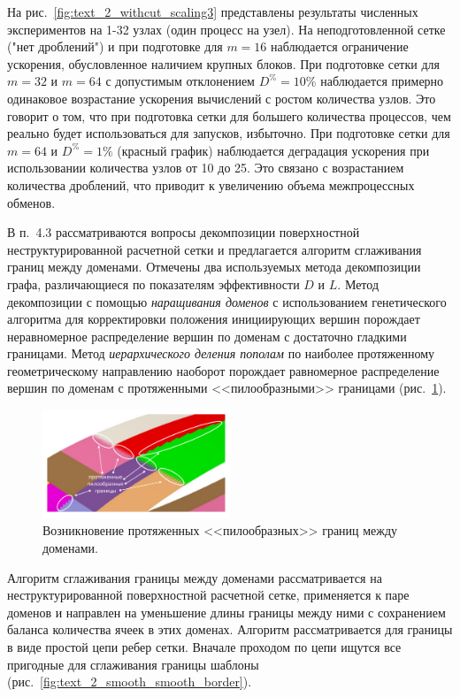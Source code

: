 \documentclass[a4paper,14pt]{extarticle}                     %
\theoremstyle{plain}                                         %
\begin{document}
На рис.~\ref{fig:text_2_withcut_scaling3} представлены результаты численных экспериментов на 1-32 узлах (один процесс на узел).
На неподготовленной сетке ("нет дроблений") и при подготовке для $m = 16$ наблюдается ограничение ускорения, обусловленное наличием крупных блоков. 
При подготовке сетки для $m = 32$ и $m = 64$ с допустимым отклонением $D^{\%} = 10\%$ наблюдается примерно одинаковое возрастание ускорения вычислений с ростом количества узлов.
Это говорит о том, что при подготовка сетки для большего количества процессов, чем реально будет использоваться для запусков, избыточно.
При подготовке сетки для $m = 64$ и $D^{\%} = 1\%$ (красный график) наблюдается деградация ускорения при использовании количества узлов от 10 до 25.
Это связано с возрастанием количества дроблений, что приводит к увеличению объема межпроцессных обменов.


В п.~4.3 рассматриваются вопросы декомпозиции поверхностной неструктурированной расчетной сетки и предлагается алгоритм сглаживания границ между доменами.
Отмечены два используемых метода декомпозиции графа, различающиеся по показателям эффективности $D$ и $L$.
Метод декомпозиции с помощью \textit{наращивания доменов} с использованием генетического алгоритма для корректировки положения инициирующих вершин порождает неравномерное распределение вершин по доменам с достаточно гладкими границами.
Метод \textit{иерархического деления пополам} по наиболее протяженному геометрическому направлению наоборот порождает равномерное распределение вершин по доменам с протяженными <<пилообразными>> границами (рис.~\ref{fig:text_2_smooth_bad_border}).

\begin{figure}[ht]
\centering
\includegraphics[width=0.5\textwidth]{./pics/text_2_smooth/bad-border.pdf}
\singlespacing
\caption{Возникновение протяженных <<пилообразных>> границ между доменами.}
\label{fig:text_2_smooth_bad_border}
\end{figure}

Алгоритм сглаживания границы между доменами рассматривается на неструктурированной поверхностной расчетной сетке, применяется к паре доменов и направлен на уменьшение длины границы между ними с сохранением баланса количества ячеек в этих доменах.
Алгоритм рассматривается для границы в виде простой цепи ребер сетки.
Вначале проходом по цепи ищутся все пригодные для сглаживания границы шаблоны (рис.~\ref{fig:text_2_smooth_smooth_border}).
\end{document}
